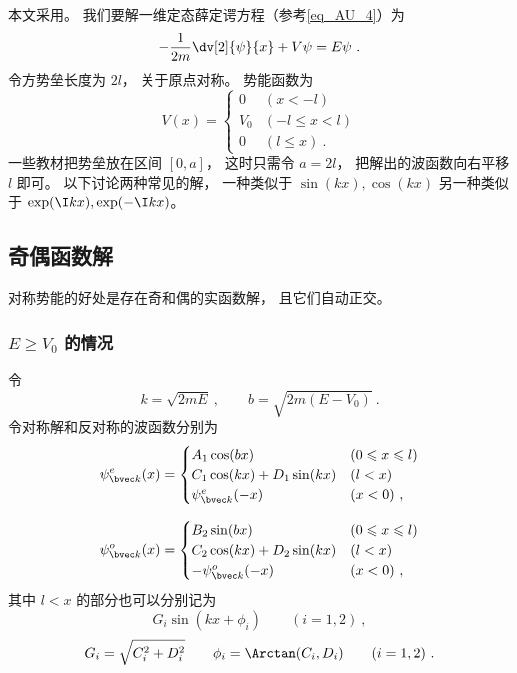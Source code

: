 


本文采用。 我们要解一维定态薛定谔方程（参考\autoref{eq_AU_4}）为
\begin{equation}
-\frac{1}{2m} \dv[2]{\psi}{x} + V\psi= E \psi~.
\end{equation}
令方势垒长度为 $2l$， 关于原点对称。 势能函数为
\begin{equation}
V(x) =
\begin{cases}
0 & (x < -l)\\
V_0 & (-l \leqslant x < l)\\
0 & (l \leqslant x)~.
\end{cases}
\end{equation}
一些教材把势垒放在区间 $[0, a]$， 这时只需令 $a = 2l$， 把解出的波函数向右平移 $l$ 即可。 以下讨论两种常见的解， 一种类似于 $\sin(kx), \cos(kx)$ 另一种类似于 $\exp(\I kx), \exp(-\I kx)$。

\subsection{奇偶函数解}
对称势能的好处是存在奇和偶的实函数解， 且它们自动正交。
\subsubsection{$E \ge V_0$ 的情况}
令
\begin{equation}
k = \sqrt{2mE}~,
\qquad
b = \sqrt{2m(E-V_0)}~.
\end{equation}
令对称解和反对称的波函数分别为
\begin{equation}
\psi_{\bvec k}^e(x) =
\begin{cases}
A_1 \cos(bx) & (0 \leqslant x \leqslant l)\\
C_1 \cos(kx) + D_1 \sin(kx) & (l < x)\\
\psi_{\bvec k}^e(-x) & (x < 0)~,
\end{cases}
\end{equation}

\begin{equation}
\psi_{\bvec k}^o(x) =
\begin{cases}
B_2 \sin(bx) & (0 \leqslant x \leqslant l)\\
C_2 \cos(kx) + D_2 \sin(kx) & (l < x)\\
-\psi_{\bvec k}^o(-x) & (x < 0)~,
\end{cases}
\end{equation}
其中 $l < x$ 的部分也可以分别记为
\begin{equation}
G_i \sin(kx + \phi_i) \qquad (i = 1,2)~,
\end{equation}
\begin{equation}
G_i = \sqrt{C_i^2 + D_i^2}
\qquad
\phi_i = \Arctan(C_i, D_i)
\qquad
(i = 1,2)~.
\end{equation}


